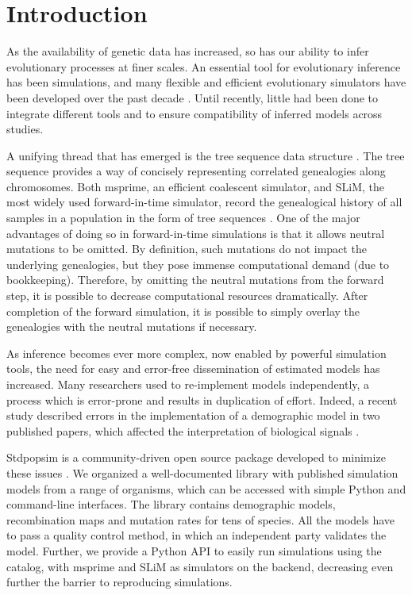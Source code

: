 \section{Introduction}

As the availability of genetic data has increased,
so has our ability to infer evolutionary processes at finer scales.
An essential tool for evolutionary inference has been simulations,
and many flexible and efficient evolutionary simulators have been developed over the past decade \citep{hudson_testing_1983, hudson_test_1987, carvajal-rodriguez_simulation_2008, ohta_simulation_1974, hoban_computer_2012, bulmer_effect_1976}.
Until recently, little had been done to integrate different tools and to ensure compatibility of inferred models across studies.

A unifying thread that has emerged is the tree sequence data structure \citep{kelleher_efficient_2016}.
The tree sequence provides a way of concisely representing correlated genealogies along chromosomes.
Both msprime, an efficient coalescent simulator, and SLiM, the most widely used forward-in-time simulator,
record the genealogical history of all samples in a population in the form of tree sequences \citep{kelleher_efficient_2018, haller_tree-sequence_2019, haller_slim_2019}.
One of the major advantages of doing so in forward-in-time simulations is that it allows neutral mutations to be omitted.
By definition, such mutations do not impact the underlying genealogies, but they pose immense computational demand (due to bookkeeping).
Therefore, by omitting the neutral mutations from the forward step, it is possible to decrease computational resources dramatically.
After completion of the forward simulation, it is possible to simply overlay the genealogies with the neutral mutations if necessary.

As inference becomes ever more complex, now enabled by powerful simulation tools,
the need for easy and error-free dissemination of estimated models has increased.
Many researchers used to re-implement models independently,
a process which is error-prone and results in duplication of effort.
Indeed, a recent study described errors in the implementation of a demographic model in two published papers,
which affected the interpretation of biological signals \citep{ragsdale_lessons_2020}.

Stdpopsim is a community-driven open source package developed to minimize these issues \citep{adrion_community-maintained_2020, lauterbur_expanding_2023}.
We organized a well-documented library with published simulation models from a range of organisms,
which can be accessed with simple Python and command-line interfaces.
The library contains demographic models, recombination maps and mutation rates for tens of species.
All the models have to pass a quality control method, in which an independent party validates the model.
Further, we provide a Python API to easily run simulations using the catalog, with msprime and SLiM as simulators on the backend,
decreasing even further the barrier to reproducing simulations.

